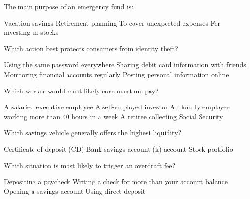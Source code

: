 \documentclass[12pt]{exam}
\begin{document}
\begin{questions}
  \begin{mcquestion}[2]
    The main purpose of an emergency fund is:
    \begin{choices}
      \choice Vacation savings
      \choice Retirement planning
      \CorrectChoice To cover unexpected expenses
      \choice For investing in stocks
    \end{choices}
  \end{mcquestion}

  \begin{mcquestion}[2]
    Which action best protects consumers from identity theft?
    \begin{choices}
      \choice Using the same password everywhere
      \choice Sharing debit card information with friends
      \CorrectChoice Monitoring financial accounts regularly
      \choice Posting personal information online
    \end{choices}
  \end{mcquestion}

  \begin{mcquestion}[2]
    Which worker would most likely earn overtime pay?
    \begin{choices}
      \choice A salaried executive employee
      \choice A self-employed investor
      \CorrectChoice An hourly employee working more than 40 hours in a week
      \choice A retiree collecting Social Security
    \end{choices}
  \end{mcquestion}

  \begin{mcquestion}[2]
    Which savings vehicle generally offers the highest liquidity?
    \begin{choices}
      \choice Certificate of deposit (CD)
      \CorrectChoice Bank savings account
      (k) account
      \choice Stock portfolio
    \end{choices}
  \end{mcquestion}

  \begin{mcquestion}[2]
    Which situation is most likely to trigger an overdraft fee?
    \begin{choices}
      \choice Depositing a paycheck
      \CorrectChoice Writing a check for more than your account balance
      \choice Opening a savings account
      \choice Using direct deposit
    \end{choices}
  \end{mcquestion}


\end{questions}
\end{document}
